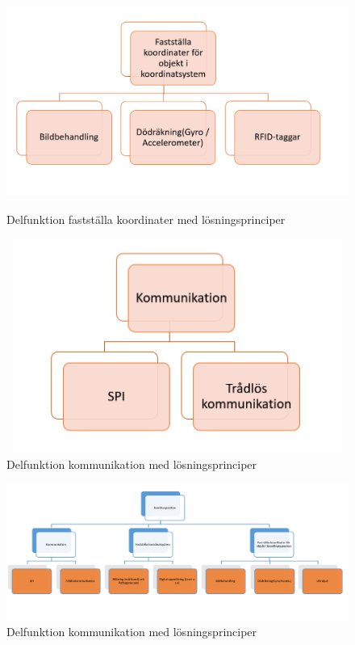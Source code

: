 \documentclass[11pt, a4paper]{report}
\begin{document}
\begin{figure}[H]
	\begin{center}
		\includegraphics [width=12cm, height=7cm, angle=0]{objekt.PNG}
		\caption{Delfunktion fastställa koordinater med lösningsprinciper}
		\label{fig:objekt}
	\end{center}
\end{figure}


\begin{figure}[H]
	\begin{center}
		\includegraphics [width=12cm,height=7cm,angle=0]{kommunikation.PNG}
		\caption{Delfunktion kommunikation med lösningsprinciper}
		\label{fig:kommunikation}
	\end{center}
\end{figure}


\begin{figure}[H]
	\begin{center}
		\includegraphics [width=12cm,angle=0]{funktionmedel.PNG}
		\caption{Delfunktion kommunikation med lösningsprinciper}
		\label{fig:funktionmedel}
	\end{center}
\end{figure}
\end{document}
